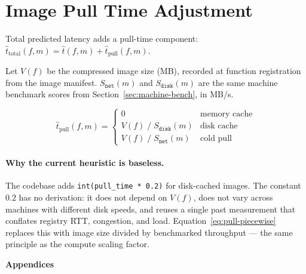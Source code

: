 \documentclass[11pt, a4paper]{article}
\begin{document}
\section{Image Pull Time Adjustment}
\label{sec:pulltime}

Total predicted latency adds a pull-time component:
$\hat{t}_{\mathrm{total}}(f, m) = \hat{t}(f, m) + \hat{t}_{\mathrm{pull}}(f, m)$.

Let $V(f)$ be the compressed image size (MB), recorded at function
registration from the image manifest. $S_{\texttt{net}}(m)$ and
$S_{\texttt{disk}}(m)$ are the same machine benchmark scores from
Section~\ref{sec:machine-bench}, in MB/s.

\begin{equation}
\label{eq:pull-piecewise}
    \hat{t}_{\mathrm{pull}}(f, m) =
    \begin{cases}
        0 & \text{memory cache} \\[6pt]
        V(f)\;/\;S_{\texttt{disk}}(m) & \text{disk cache} \\[6pt]
        V(f)\;/\;S_{\texttt{net}}(m) & \text{cold pull}
    \end{cases}
\end{equation}

\paragraph{Why the current heuristic is baseless.}
The codebase adds \texttt{int(pull\_time * 0.2)} for disk-cached images.
The constant $0.2$ has no derivation: it does not depend on $V(f)$,
does not vary across machines with different disk speeds, and reuses a
single past measurement that conflates registry RTT, congestion, and
load. Equation~\ref{eq:pull-piecewise} replaces this with image size
divided by benchmarked throughput --- the same principle as the compute
scaling factor.

\newpage
\appendix
\begin{center}
    {\Large\bfseries Appendices}
\end{center}
\bigskip

\end{document}
